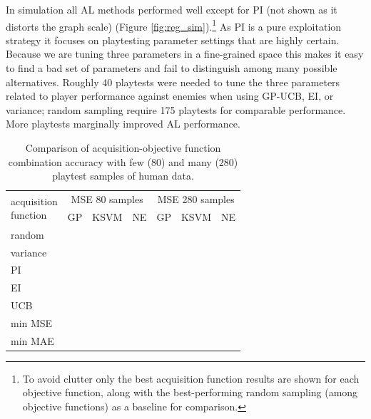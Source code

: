 \documentclass{sig-alternate}
\begin{document}

In simulation all AL methods performed well except for PI (not shown as it distorts the graph scale) (Figure \ref{fig:reg_sim}).\footnote{To avoid clutter only the best acquisition function results are shown for each objective function, along with the best-performing random sampling (among objective functions) as a baseline for comparison.}
As PI is a pure exploitation strategy it focuses on playtesting parameter settings that are highly certain.
Because we are tuning three parameters in a fine-grained space this makes it easy to find a bad set of parameters and fail to distinguish among many possible alternatives.
%
%
Roughly 40 playtests were needed to tune the three parameters related to player performance against enemies when using GP-UCB, EI, or variance; random sampling require 175 playtests for comparable performance.
More playtests marginally improved AL performance.

\begin{table}[tb]
\centering
\caption{Comparison of acquisition-objective function combination accuracy with few (80) and many (280) playtest samples of human data.}
\begin{tabularx}{0.46\textwidth}{|X|c|c|c|c|c|c|}
\hline \multirow{2}{*}{\parbox[t]{5cm}{acquisition \\ function}} & \multicolumn{3}{|c|}{MSE 80 samples} & \multicolumn{3}{|c|}{MSE 280 samples}  \\ \cline{2-7}
& GP & KSVM & NE & GP & KSVM & NE \\ 
\hline random &  &  &  &  &  &  \\ 
\hline variance &  &  &  &  &  &  \\ 
\hline PI &  &  &  &  &  &  \\ 
\hline EI &  &  &  &  &  &  \\ 
\hline UCB &  &  &  &  &  &  \\ 
\hline min MSE &  &  &  &  &  &  \\ 
\hline min MAE &  &  &  &  &  &  \\ 
\hline 
\end{tabularx}
\label{tab:reg_expr}
\end{table}
\end{document}
